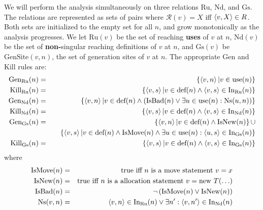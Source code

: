 \documentclass[11pt,notitlepage]{article}
\begin{document}
We will perform the analysis simultaneously on three relations
$\text{Ru}$, $\text{Nd}$, and $\text{Gs}$.
The relations are represented as
sets of pairs  where
$\mathcal{R}(v)=X$ iff $\left\langle v,X \right\rangle \in R$.
Both sets are initialized
to the empty set for all $n$, and grow monotonically as the analysis
progresses.
We let
$\text{Ru}(v)$ be the set of reaching \textbf{uses} of $v$ at $n$,
$\text{Nd}(v)$ be the set of \textbf{non-}singular reaching definitions
of $v$ at $n$,
 and
$\text{Gs}(v)$ be $\text{GenSite}(v,n)$, the set of generation sites
of $v$ at $n$.
The appropriate Gen and Kill rules are:
\begin{eqnarray*}
\text{Gen}_\text{Ru}(n) &=&
        \left\{ \tuple{v, n} | v \in \text{use}(n) \right\} \\
\text{Kill}_\text{Ru}(n) &=&
        \left\{ \tuple{v, s} | v \in \text{def}(n) \wedge
                          \tuple{v,s} \in \text{In}_\text{Ru}(n) \right\} \\
%
\text{Gen}_\text{Nd}(n) &=&
        \left\{ \tuple{v, n} | v \in \text{def}(n) \wedge
\left( \text{IsBad}(n) \vee
\exists u\in\text{use}(n):\text{Ns}(u,n)
 \right) \right\}
\\
\text{Kill}_\text{Nd}(n) &=&
        \left\{ \tuple{v, s} | v \in \text{def}(n) \wedge
                          \tuple{v,s} \in \text{In}_\text{Nd}(n) \right\} \\
\text{Gen}_\text{Gs}(n) &=&
       \left\{ \tuple{v, n} | v \in \text{def}(n)\wedge\text{IsNew}(n)\right\}
       \cup\\&&\quad
       \left\{ \tuple{v, s} | v \in \text{def}(n)\wedge\text{IsMove}(n) \wedge
                              \exists u\in\text{use}(n) :
                                 \tuple{u,s}\in \text{In}_\text{Gs}(n)\right\}
\\
\text{Kill}_\text{Gs}(n) &=&
       \left\{ \tuple{v, s} | v \in \text{def}(n) \wedge
                         \tuple{v,s} \in \text{In}_\text{Gs}(n) \right\} %
\end{eqnarray*}
where
\begin{eqnarray*}
\text{IsMove}(n) &=& \text{true iff }n\text{ is a move statement } v=x\\
\text{IsNew}(n) &=& \text{true iff }n\text{ is a allocation statement } v=\text{new }T(\ldots)\\
\text{IsBad}(n) &=& \neg\left(\text{IsMove}(n) \vee \text{IsNew}(n)\right) \\
\text{Ns}(v,n) &=&
\left\langle v,n \right\rangle \in \text{In}_\text{Ru}(n) \vee
\exists n': \left\langle v,n' \right\rangle\in\text{In}_\text{Nd}(n)
\end{eqnarray*}
\end{document}
